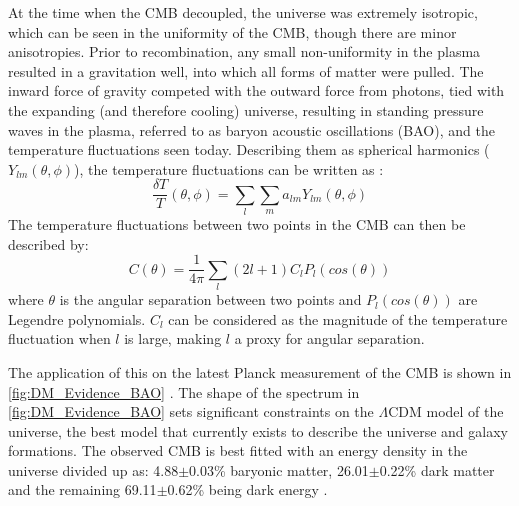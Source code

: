 \par
At the time when the CMB decoupled, the universe was extremely isotropic, which can be seen in the uniformity of the CMB, though there are minor anisotropies.
Prior to recombination, any small non-uniformity in the plasma resulted in a gravitation well, into which all forms of matter were pulled.
The inward force of gravity competed with the outward force from photons, tied with the expanding (and therefore cooling) universe, resulting in standing pressure waves in the plasma, referred to as baryon acoustic oscillations (BAO), and the temperature fluctuations seen today.
Describing them as spherical harmonics ($Y_{lm}(\theta,\phi)$), the temperature fluctuations can be written as \cite{History_Of_Dark_Matter_2018_ref}:
\begin{equation}
    \frac{\delta T}{T}(\theta, \phi) = \sum_{l} \sum_{m} a_{lm}Y_{lm}(\theta,\phi)
    \label{eq:bao_spherical_harmonics}
\end{equation}
The temperature fluctuations between two points in the CMB can then be described by:
\begin{equation}
    C(\theta) = \frac{1}{4\pi} \sum_{l} (2l + 1) C_l P_l (cos(\theta))
\end{equation}
where $\theta$ is the angular separation between two points and $P_l (cos(\theta))$ are Legendre polynomials.
$C_l$ can be considered as the magnitude of the temperature fluctuation when $l$ is large, making $l$ a proxy for angular separation.
\par
The application of this on the latest Planck measurement of the CMB is shown in \autoref{fig:DM_Evidence_BAO} \cite{plank_result_ref}.
The shape of the spectrum in \autoref{fig:DM_Evidence_BAO} sets significant constraints on the $\Lambda$CDM model of the universe, the best model that currently exists to describe the universe and galaxy formations.
The observed CMB is best fitted with an energy density in the universe divided up as: 4.88$\pm$0.03\% baryonic matter, 26.01$\pm$0.22\% dark matter and the remaining 69.11$\pm$0.62\% being dark energy \cite{plank_result_ref}.

